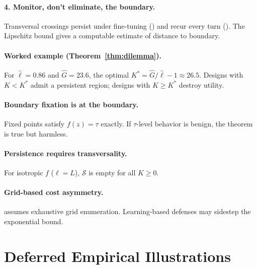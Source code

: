 \documentclass[11pt]{article}
\begin{document}
\paragraph{4. Monitor, don't eliminate, the boundary.}
Transversal crossings persist under fine-tuning ()
and recur every turn (). The Lipschitz bound gives a
computable estimate of distance to boundary.

\paragraph{Worked example (Theorem~\ref{thm:dilemma}).}
For $\hat\ell = 0.86$ and $\hat G = 23.6$, the optimal $K^* = \hat G / \hat\ell - 1 \approx 26.5$. Designs with $K < K^*$ admit a persistent region; designs with $K \geq K^*$ destroy utility.

\paragraph{Boundary fixation is at the boundary.}
Fixed points satisfy $f(z) = \tau$ exactly. If $\tau$-level behavior
is benign, the theorem is true but harmless.

\paragraph{Persistence requires transversality.}
For isotropic $f$ ($\ell = L$), $\mathcal{S}$ is empty for all $K \geq 0$.

\paragraph{Grid-based cost asymmetry.}
 assumes exhaustive grid enumeration. Learning-based
defenses may sidestep the exponential bound.

\section{Deferred Empirical Illustrations}
\label{app:deferred-empirical}

\begin{table}[h]
\centering
\small
\caption{Continuous-defense validator across three OpenAI target
models. $\mathrm{FP}_{\mathrm{int}} = 0$ holds across all three.}
\label{tab:three-target}

\end{table}

\begin{table}[h]
\centering
\small
\caption{Llama-Guard-3-1B applied to the $82$
unsafe-seed prompts, demonstrating
's injective-incomplete horn. 51 of 82 attacks pass as \texttt{safe}.}
\label{tab:llamaguard-demo}

\end{table}
\end{document}
